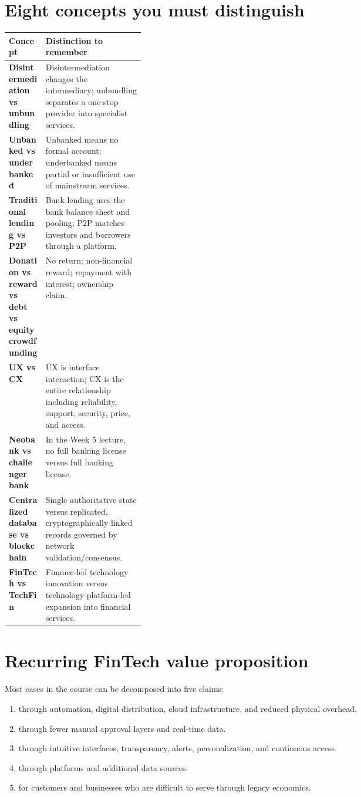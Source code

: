 \section*{Eight concepts you must distinguish}

\begin{mltable}
\begin{tabularx}{\linewidth}{@{}>{\bfseries\color{MLNavy}}p{0.27\linewidth}X@{}}
\toprule
\rowcolor{MLPaleBlue!92}
Concept & Distinction to remember \\
\midrule
Disintermediation vs unbundling & Disintermediation changes the intermediary; unbundling separates a one-stop provider into specialist services. \\
Unbanked vs underbanked & Unbanked means no formal account; underbanked means partial or insufficient use of mainstream services. \\
Traditional lending vs P2P & Bank lending uses the bank balance sheet and pooling; P2P matches investors and borrowers through a platform. \\
Donation vs reward vs debt vs equity crowdfunding & No return; non-financial reward; repayment with interest; ownership claim. \\
UX vs CX & UX is interface interaction; CX is the entire relationship including reliability, support, security, price, and access. \\
Neobank vs challenger bank & In the Week 5 lecture, no full banking license versus full banking license. \\
Centralized database vs blockchain & Single authoritative state versus replicated, cryptographically linked records governed by network validation/consensus. \\
FinTech vs TechFin & Finance-led technology innovation versus technology-platform-led expansion into financial services. \\
\bottomrule
\end{tabularx}
\end{mltable}

\section*{Recurring FinTech value proposition}

Most cases in the course can be decomposed into five claims:

\begin{enumerate}
  \item {} through automation, digital distribution, cloud infrastructure, and reduced physical overhead.
  \item {} through fewer manual approval layers and real-time data.
  \item {} through intuitive interfaces, transparency, alerts, personalization, and continuous access.
  \item {} through platforms and additional data sources.
  \item {} for customers and businesses who are difficult to serve through legacy economics.
\end{enumerate}

